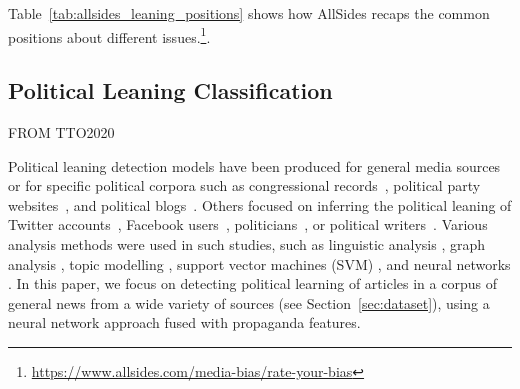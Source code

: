 Table~\ref{tab:allsides_leaning_positions} shows how AllSides recaps the common positions about different issues.\footnote{\url{https://www.allsides.com/media-bias/rate-your-bias}}.




\subsection{Political Leaning Classification}
\label{ssec:lit_leaning_classification}

FROM TTO2020



Political leaning detection models have been produced for general media sources~\citep{budak} or for 
specific political corpora such as congressional records~\citep{gentzkow}, political party websites~\citep{yan2017perils}, and political blogs~\citep{ahmed201}.  
Others focused on inferring the political leaning of Twitter accounts~\citep{Cohen2013ClassifyingPO}, Facebook users~\citep{Bakshy1130}, politicians~\citep{thomas-etal-2006-get}, or political writers~\citep{iyyer-etal-2014-political}. 
Various analysis methods were used in such studies, such as linguistic analysis \citep{gentzkow}, graph analysis \citep{chen2017opinion}, topic modelling \citep{ahmed201, Cohen2013ClassifyingPO}, support vector machines (SVM) \citep{Bakshy1130,thomas-etal-2006-get}, and neural networks \citep{iyyer-etal-2014-political,baly2020we}. In this paper, we focus on detecting political learning of articles in a corpus of general news from a wide variety of sources (see Section~\ref{sec:dataset}), using a neural network approach fused with propaganda features. %



